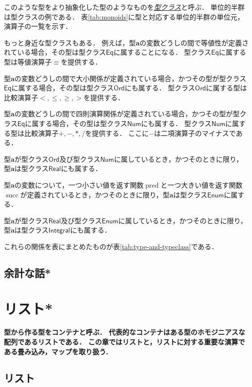\documentclass[twocolumn]{jsbook}
\newcommand{\keyword}[1]{\underline{\emph{#1}}}
\newenvironment{leader}{\begingroup\bf}{\endgroup}
\newcommand{\hsklType}[1]{\textbf{#1}}
\newcommand{\hsklTypeclass}[1]{\mathsf{#1}}
\DeclareMathOperator{\hsklPred}{pred}
\DeclareMathOperator{\hsklSucc}{succ}
\newcommand{\hsklEnum}{\hsklTypeclass{Enum}}
\newcommand{\hsklIntegral}{\hsklTypeclass{Integral}}
\newcommand{\hsklEq}{\hsklTypeclass{Eq}}
\newcommand{\hsklNum}{\hsklTypeclass{Num}}
\newcommand{\hsklOrd}{\hsklTypeclass{Ord}}
\newcommand{\hsklReal}{\hsklTypeclass{Real}}
\begin{document}
このような型をより抽象化した型のようなものを\keyword{型クラス}と呼ぶ．
単位的半群は型クラスの例である．
表\ref{tab:monoids}に型と対応する単位的半群の単位元，演算子の一覧を示す．

もっと身近な型クラスもある．
例えば，型$\hsklType{a}$の変数どうしの間で等値性が定義されている場合，その型は型クラス$\hsklEq$に属することになる．
型クラス$\hsklEq$に属する型は等値演算子$\equiv$を提供する．

型$\hsklType{a}$の変数どうしの間で大小関係が定義されている場合，かつその型が型クラス$\hsklEq$に属する場合，その型は型クラス$\hsklOrd$にも属する．
型クラス$\hsklOrd$に属する型は比較演算子$<,\le,\ge,>$を提供する．

型$\hsklType{a}$の変数どうしの間で四則演算関係が定義されている場合，かつその型が型クラス$\hsklEq$に属する場合，その型は型クラス$\hsklNum$にも属する．
型クラス$\hsklNum$に属する型は比較演算子$+,-,*,/$を提供する．
ここに$-$は二項演算子のマイナスである．

型$\hsklType{a}$が型クラス$\hsklOrd$及び型クラス$\hsklNum$に属しているとき，かつそのときに限り，型$\hsklType{a}$は型クラス$\hsklReal$にも属する．

型$\hsklType{a}$の変数について，一つ小さい値を返す関数$\hsklPred$と一つ大きい値を返す関数$\hsklSucc$が定義されているとき，かつそのときに限り，型$\hsklType{a}$は型クラス$\hsklEnum$に属する．

型$\hsklType{a}$が型クラス$\hsklReal$及び型クラス$\hsklEnum$に属しているとき，かつそのときに限り，型$\hsklType{a}$は型クラス$\hsklIntegral$にも属する．

これらの関係を表にまとめたものが表\ref{tab:type-and-typeclass}である．



\section*{余計な話*}

\chapter{リスト*}

\begin{leader}
型から作る型をコンテナと呼ぶ．
代表的なコンテナはある型のホモジニアスな配列であるリストである．
この章ではリストと，リストに対する重要な演算である畳み込み，マップを取り扱う．
\end{leader}

\section{リスト}
\end{document}
